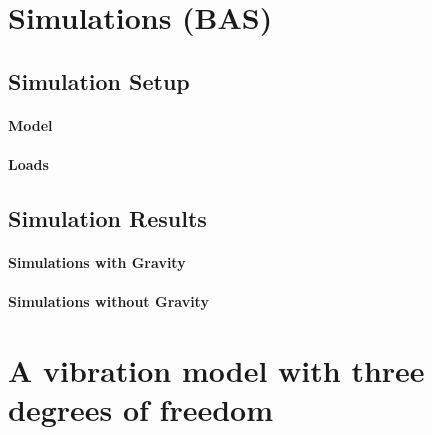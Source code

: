 \documentclass{article}
\begin{document}
\clearpage

\section{Simulations (BAS)}
\label{sec:simulations}

\subsection{Simulation Setup}

\paragraph{Model}

\paragraph{Loads}

\subsection{Simulation Results}

\paragraph{Simulations with Gravity}

\paragraph{Simulations without Gravity}

\clearpage

\section{A vibration model with three degrees of freedom}
\label{sec:3dof}
\end{document}
